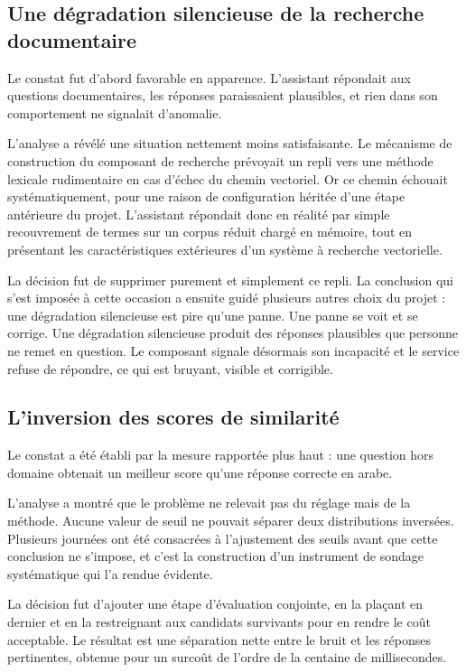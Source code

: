 \subsection{Une dégradation silencieuse de la recherche documentaire}

Le constat fut d'abord favorable en apparence. L'assistant répondait aux questions documentaires, les réponses paraissaient plausibles, et rien dans son comportement ne signalait d'anomalie.

L'analyse a révélé une situation nettement moins satisfaisante. Le mécanisme de construction du composant de recherche prévoyait un repli vers une méthode lexicale rudimentaire en cas d'échec du chemin vectoriel. Or ce chemin échouait systématiquement, pour une raison de configuration héritée d'une étape antérieure du projet. L'assistant répondait donc en réalité par simple recouvrement de termes sur un corpus réduit chargé en mémoire, tout en présentant les caractéristiques extérieures d'un système à recherche vectorielle.

La décision fut de supprimer purement et simplement ce repli. La conclusion qui s'est imposée à cette occasion a ensuite guidé plusieurs autres choix du projet : une dégradation silencieuse est pire qu'une panne. Une panne se voit et se corrige. Une dégradation silencieuse produit des réponses plausibles que personne ne remet en question. Le composant signale désormais son incapacité et le service refuse de répondre, ce qui est bruyant, visible et corrigible.

\subsection{L'inversion des scores de similarité}

Le constat a été établi par la mesure rapportée plus haut : une question hors domaine obtenait un meilleur score qu'une réponse correcte en arabe.

L'analyse a montré que le problème ne relevait pas du réglage mais de la méthode. Aucune valeur de seuil ne pouvait séparer deux distributions inversées. Plusieurs journées ont été consacrées à l'ajustement des seuils avant que cette conclusion ne s'impose, et c'est la construction d'un instrument de sondage systématique qui l'a rendue évidente.

La décision fut d'ajouter une étape d'évaluation conjointe, en la plaçant en dernier et en la restreignant aux candidats survivants pour en rendre le coût acceptable. Le résultat est une séparation nette entre le bruit et les réponses pertinentes, obtenue pour un surcoût de l'ordre de la centaine de millisecondes.

